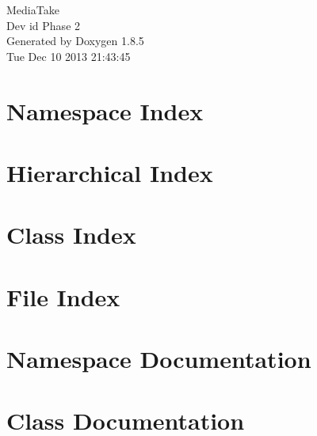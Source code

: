 \documentclass[twoside]{book}
\newcommand{\clearemptydoublepage}{%
  \newpage{\pagestyle{empty}\cleardoublepage}%
}
\begin{document}
\hypersetup{pageanchor=false}
\begin{titlepage}
\vspace*{7cm}
\begin{center}%
{\Large Media\-Take \\[1ex]\large Dev id Phase 2 }\\
\vspace*{1cm}
{\large Generated by Doxygen 1.8.5}\\
\vspace*{0.5cm}
{\small Tue Dec 10 2013 21:43:45}\\
\end{center}
\end{titlepage}
\clearemptydoublepage
\tableofcontents
\clearemptydoublepage
{}
\hypersetup{pageanchor=true}

\chapter{Namespace Index}

\chapter{Hierarchical Index}

\chapter{Class Index}

\chapter{File Index}

\chapter{Namespace Documentation}

\chapter{Class Documentation}











\end{document}
